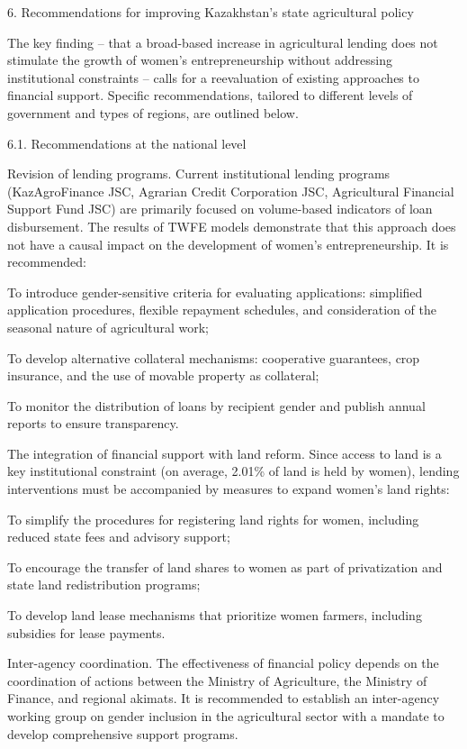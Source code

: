 6. Recommendations for improving Kazakhstan's state agricultural policy

The key finding -- that a broad-based increase in agricultural lending
does not stimulate the growth of women's entrepreneurship without
addressing institutional constraints -- calls for a reevaluation of
existing approaches to financial support. Specific recommendations,
tailored to different levels of government and types of regions, are
outlined below.

6.1. Recommendations at the national level

Revision of lending programs. Current institutional lending programs
(KazAgroFinance JSC, Agrarian Credit Corporation JSC, Agricultural
Financial Support Fund JSC) are primarily focused on volume-based
indicators of loan disbursement. The results of TWFE models demonstrate
that this approach does not have a causal impact on the development of
women's entrepreneurship. It is recommended:

To introduce gender-sensitive criteria for evaluating applications:
simplified application procedures, flexible repayment schedules, and
consideration of the seasonal nature of agricultural work;

To develop alternative collateral mechanisms: cooperative guarantees,
crop insurance, and the use of movable property as collateral;

To monitor the distribution of loans by recipient gender and publish
annual reports to ensure transparency.

The integration of financial support with land reform. Since access to
land is a key institutional constraint (on average, 2.01\% of land is
held by women), lending interventions must be accompanied by measures to
expand women's land rights:

To simplify the procedures for registering land rights for women,
including reduced state fees and advisory support;

To encourage the transfer of land shares to women as part of
privatization and state land redistribution programs;

To develop land lease mechanisms that prioritize women farmers,
including subsidies for lease payments.

Inter-agency coordination. The effectiveness of financial policy depends
on the coordination of actions between the Ministry of Agriculture, the
Ministry of Finance, and regional akimats. It is recommended to
establish an inter-agency working group on gender inclusion in the
agricultural sector with a mandate to develop comprehensive support
programs.

